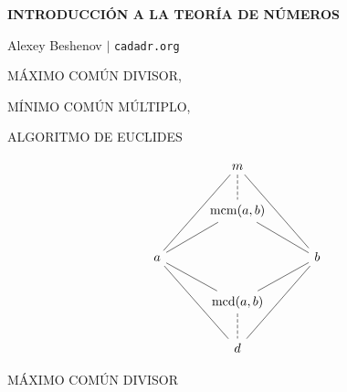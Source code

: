 



\begin{frame}
  \textbf{INTRODUCCIÓN A LA TEORÍA DE NÚMEROS}

  Alexey Beshenov $\mid$ \texttt{cadadr.org}

  \vfill

  \begin{center}\huge\headingfont
    MÁXIMO COMÚN DIVISOR,

    \vspace{0.5em}

    MÍNIMO COMÚN MÚLTIPLO,

    \vspace{0.5em}

    ALGORITMO DE EUCLIDES
  \end{center}

  \vfill
\end{frame}

\begin{frame}[fragile]
  \vfill

  \[ \begin{tikzcd}[row sep=2em, column sep=3em]
      & m\ar[dashed,-]{d}\ar[-]{ddl}\ar[-]{ddr} \\
      & \mcm (a,b)\ar[-]{dl}\ar[-]{dr} \\
      a\ar[-]{dr}\ar[-]{ddr} && b\ar[-]{dl}\ar[-]{ddl} \\
      & \mcd (a,b)\ar[dashed,-]{d} \\
      & d
    \end{tikzcd} \]

  \vfill
\end{frame}

\begin{frame}
  \vfill

  \begin{center}\huge\headingfont
    MÁXIMO COMÚN DIVISOR
  \end{center}

  \vfill
\end{frame}

